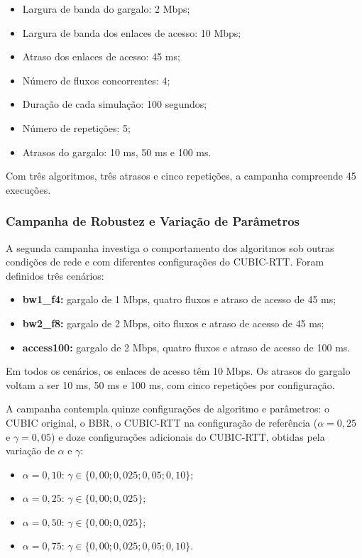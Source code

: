 \documentclass[a4paper,12pt]{monografia}
\begin{document}
\begin{itemize}
    \item Largura de banda do gargalo: 2 Mbps;
    \item Largura de banda dos enlaces de acesso: 10 Mbps;
    \item Atraso dos enlaces de acesso: 45 ms;
    \item Número de fluxos concorrentes: 4;
    \item Duração de cada simulação: 100 segundos;
    \item Número de repetições: 5;
    \item Atrasos do gargalo: 10 ms, 50 ms e 100 ms.
\end{itemize}

Com três algoritmos, três atrasos e cinco repetições, a campanha compreende 45 execuções.

\subsubsection{Campanha de Robustez e Variação de Parâmetros}
\label{sec:robustez}

A segunda campanha investiga o comportamento dos algoritmos sob outras condições de rede e com diferentes configurações do CUBIC-RTT. Foram definidos três cenários:

\begin{itemize}
    \item \textbf{bw1\_f4:} gargalo de 1 Mbps, quatro fluxos e atraso de acesso de 45 ms;
    \item \textbf{bw2\_f8:} gargalo de 2 Mbps, oito fluxos e atraso de acesso de 45 ms;
    \item \textbf{access100:} gargalo de 2 Mbps, quatro fluxos e atraso de acesso de 100 ms.
\end{itemize}

Em todos os cenários, os enlaces de acesso têm 10 Mbps. Os atrasos do gargalo voltam a ser 10 ms, 50 ms e 100 ms, com cinco repetições por configuração.

A campanha contempla quinze configurações de algoritmo e parâmetros: o CUBIC original, o BBR, o CUBIC-RTT na configuração de referência ($\alpha=0{,}25$ e $\gamma=0{,}05$) e doze configurações adicionais do CUBIC-RTT, obtidas pela variação de $\alpha$ e $\gamma$:

\begin{itemize}
    \item $\alpha=0{,}10$: $\gamma \in \{0{,}00; 0{,}025; 0{,}05; 0{,}10\}$;
    \item $\alpha=0{,}25$: $\gamma \in \{0{,}00; 0{,}025\}$;
    \item $\alpha=0{,}50$: $\gamma \in \{0{,}00; 0{,}025\}$;
    \item $\alpha=0{,}75$: $\gamma \in \{0{,}00; 0{,}025; 0{,}05; 0{,}10\}$.
\end{itemize}
\end{document}
